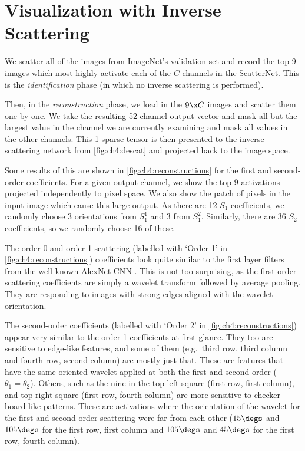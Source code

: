 \section{Visualization with Inverse Scattering}
{
\renewcommand{\_}{\textscale{.6}{\textunderscore}}
\label{sec:ch4:visualization}

We scatter all of the images from ImageNet's validation set and record the top 9
images which most highly activate each of the $C$ channels in the ScatterNet.
This is the \emph{identification} phase (in which no inverse scattering is
performed).

Then, in the \emph{reconstruction} phase, we load in the $9\x C$ images and
scatter them one by one. We take the resulting 52 channel output vector and mask
all but the largest value in the channel we are currently
examining and mask all values in the other channels.
This 1-sparse tensor is then presented to the inverse scattering network from
\autoref{fig:ch4:descat} and projected back to the image space.

Some results of this are shown in \autoref{fig:ch4:reconstructions} for the
first and second-order coefficients. For a given output channel, we show the top
9 activations projected independently to pixel space. We also show the patch
of pixels in the input image which cause this large output. As there are 12
$S_1$ coefficients, we randomly choose 3 orientations from $S_1^1$ and 3 from $S_1^2$.
Similarly, there are 36 $S_2$ coefficients, so we randomly choose 16 of these.

The order 0 and order 1 scattering (labelled with `Order 1' in
\autoref{fig:ch4:reconstructions}) coefficients look quite similar to the first
layer filters from the well-known AlexNet CNN \cite{krizhevsky_imagenet_2012}.
This is not too surprising, as the first-order scattering coefficients are
simply a wavelet transform followed by average pooling. They are responding to
images with strong edges aligned with the wavelet orientation.

The second-order coefficients (labelled with `Order
2' in \autoref{fig:ch4:reconstructions}) appear very similar to the order
1 coefficients at first glance.
They too are sensitive to edge-like features, and some of them (e.g.\ third row,
third column and fourth row, second column) are mostly just that. These are
features that have the same oriented wavelet applied at both the first and
second-order ($\theta_1 = \theta_2$). Others, such as the nine in the top left
square (first row, first column), and top right square (first row, fourth
column) are more sensitive to checker-board like patterns. These are
activations where the orientation of the wavelet for the first and second-order
scattering were far from each other ($15\degs$ and $105\degs$ for the first row,
first column and $105\degs$ and $45\degs$ for the first row, fourth column).

}
